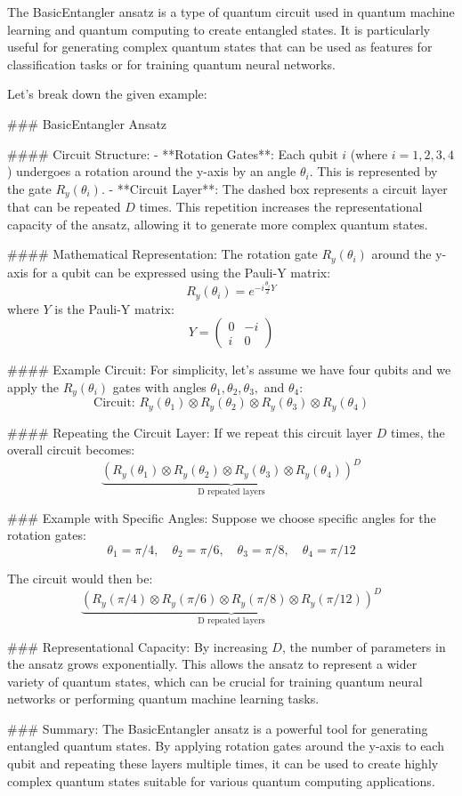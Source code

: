 The BasicEntangler ansatz is a type of quantum circuit used in quantum machine learning and quantum computing to create entangled states. It is particularly useful for generating complex quantum states that can be used as features for classification tasks or for training quantum neural networks.

Let's break down the given example:

### BasicEntangler Ansatz

#### Circuit Structure:
- **Rotation Gates**: Each qubit \(i\) (where \(i = 1, 2, 3, 4\)) undergoes a rotation around the y-axis by an angle \(\theta_i\). This is represented by the gate \(R_y(\theta_i)\).
- **Circuit Layer**: The dashed box represents a circuit layer that can be repeated \(D\) times. This repetition increases the representational capacity of the ansatz, allowing it to generate more complex quantum states.

#### Mathematical Representation:
The rotation gate \(R_y(\theta_i)\) around the y-axis for a qubit can be expressed using the Pauli-Y matrix:
\[ R_y(\theta_i) = e^{-i \frac{\theta_i}{2} Y} \]
where \(Y\) is the Pauli-Y matrix:
\[ Y = \begin{pmatrix}
0 & -i \\
i & 0
\end{pmatrix} \]

#### Example Circuit:
For simplicity, let's assume we have four qubits and we apply the \(R_y(\theta_i)\) gates with angles \(\theta_1, \theta_2, \theta_3,\) and \(\theta_4\):
\[ \text{Circuit: } R_y(\theta_1) \otimes R_y(\theta_2) \otimes R_y(\theta_3) \otimes R_y(\theta_4) \]

#### Repeating the Circuit Layer:
If we repeat this circuit layer \(D\) times, the overall circuit becomes:
\[ \underbrace{(R_y(\theta_1) \otimes R_y(\theta_2) \otimes R_y(\theta_3) \otimes R_y(\theta_4))^D}_{\text{D repeated layers}} \]

### Example with Specific Angles:
Suppose we choose specific angles for the rotation gates:
\[ \theta_1 = \pi/4, \quad \theta_2 = \pi/6, \quad \theta_3 = \pi/8, \quad \theta_4 = \pi/12 \]

The circuit would then be:
\[ \underbrace{(R_y(\pi/4) \otimes R_y(\pi/6) \otimes R_y(\pi/8) \otimes R_y(\pi/12))^D}_{\text{D repeated layers}} \]

### Representational Capacity:
By increasing \(D\), the number of parameters in the ansatz grows exponentially. This allows the ansatz to represent a wider variety of quantum states, which can be crucial for training quantum neural networks or performing quantum machine learning tasks.

### Summary:
The BasicEntangler ansatz is a powerful tool for generating entangled quantum states. By applying rotation gates around the y-axis to each qubit and repeating these layers multiple times, it can be used to create highly complex quantum states suitable for various quantum computing applications.